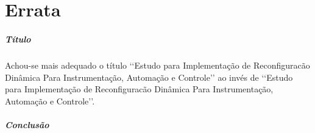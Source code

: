 ﻿%

\chapter{Errata}

\paragraph{Título} Achou-se mais adequado o título \lq\lq{}Estudo para Implementação de Reconfiguracão Dinâmica Para Instrumentação, Automação e Controle\rq\rq{} ao invés de \lq\lq{}Estudo para Implementação de Reconfiguracão Dinâmica Para Instrumentação, Automação e Controle\rq\rq{}.

\paragraph{Conclusão} 
